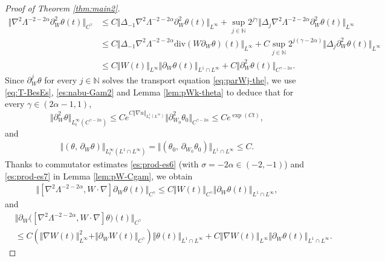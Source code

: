 \documentclass[reqno,11pt,a4paper]{amsart}
\newcommand{\NN}{\ensuremath{\mathbb{N}}}
\def \p {\partial}
\begin{document}
\begin{proof}[Proof of Theorem \ref{thm:main2}]
\begin{align*}
  \Vert \nabla^2 \Lambda^{-2-2\alpha} \p^2_W\theta(t)\Vert _{C^\gamma}
  & \leq C \Vert \Delta_{-1} \nabla^2 \Lambda^{-2-2\alpha} \p^2_W\theta (t)\Vert _{L^\infty} 
  + \sup\limits_{j\in\NN}2^{j\gamma}\Vert \Delta_j \nabla^2\Lambda^{-2-2\alpha} \p^2_W\theta (t)\Vert _{L^\infty}\\
  &\leq C \Vert \Delta_{-1} \nabla^2 \Lambda^{-2-2\alpha}\mathrm{div}(W \p_W\theta) (t)\Vert _{L^\infty} 
  + C \sup\limits_{j\in\NN}2^{j(\gamma-2\alpha)}\Vert \Delta_j \p^2_W\theta(t)\Vert _{L^\infty}  \\
  & \leq C \Vert W(t)\Vert _{L^\infty}\Vert  \p_W\theta(t)\Vert _{L^1\cap L^\infty} + C \Vert \p^2_W\theta(t)\Vert _{C^{\gamma-2\alpha}} .
\end{align*}
Since $\partial_W^j\theta$ for every $j\in\mathbb{N}$ solves the transport equation \eqref{eq:parWj-the},
we use \eqref{eq:T-BesEs}, \eqref{es:nabu-Gam2} and Lemma \ref{lem:pWk-theta} to deduce that for every $\gamma\in(2\alpha-1,1)$,
\begin{equation*}
  \Vert \partial_W^2\theta\Vert _{L_t^\infty(C^{\gamma-2\alpha})}
  \leq Ce^{C\Vert \nabla u\Vert _{L_t^1(L^\infty)}}\Vert \partial_{W_0}^2\theta_0\Vert _{C^{\gamma-2\alpha}}\leq Ce^{\exp (Ct)},
\end{equation*}
and 
\begin{equation}\label{eq:the-uni-bdd2}
\begin{aligned}
  \Vert (\theta,\,\partial_W\theta)\Vert _{L_t^\infty(L^1\cap L^\infty)} 
  = \Vert (\theta_0,\,\partial_{W_0}\theta_0)\Vert _{L^1\cap L^\infty} \leq C.
\end{aligned}
\end{equation}
Thanks to commutator estimates \eqref{es:prod-es6} (with $\sigma=-2\alpha\in (-2,-1)$) 
and \eqref{es:prod-es7} in Lemma \ref{lem:pW-Cgam}, we obtain 
\begin{align*}
  \Vert [\nabla^2\Lambda^{-2-2\alpha}, W\cdot\nabla]\p_W\theta(t)\Vert _{C^\gamma}
  \leq C\Vert W(t)\Vert _{C^\gamma}\Vert \p_W\theta(t)\Vert _{L^1\cap L^\infty},
\end{align*}
and
\begin{align*}
  & \big\Vert \p_W\big([\nabla^2 \Lambda^{-2-2\alpha}, W\cdot\nabla]\theta\big)(t)\big\Vert _{C^\gamma} \\
  & \leq C\left(\Vert \nabla W(t)\Vert _{L^\infty}^2 + \Vert \partial_W W(t)\Vert _{C^\gamma}\right)\Vert \theta(t)\Vert _{L^1\cap L^\infty} 
  + C \Vert \nabla W(t)\Vert _{L^\infty}\Vert \partial_W\theta(t)\Vert _{L^1\cap L^\infty}.

\end{align*}
\end{proof}
\end{document}
